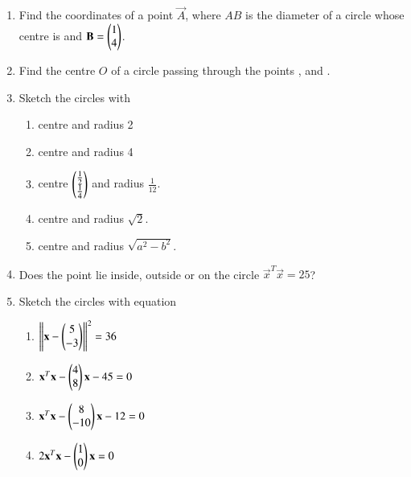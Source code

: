 \renewcommand{\theequation}{\theenumi}
\begin{enumerate}[label=\arabic*.,ref=\thesubsection.\theenumi]
\item Find the coordinates of a point $\vec{A}$, where $AB$ is the diameter of a circle whose centre is  and $\mathbf{B} = \begin{pmatrix}1\\4\end{pmatrix}$.
\\
\solution 

\item Find the centre $O$ of a circle passing through the points ,  and  .
\solution 

\item Sketch the circles with 
\begin{enumerate}
\item centre  and radius 2
\item centre  and radius 4
\item centre $\begin{pmatrix}\frac{1}{2}\\ \frac{1}{4}\end{pmatrix}$ and radius $\frac{1}{12}$.
\item centre  and radius $\sqrt{2}$.
\item centre  and radius $\sqrt{a^2-b^2}$.
\end{enumerate}
\solution 

\item  Does the point  lie inside, outside or on the circle $\vec{x}^T\vec{x} = 25$?
\\
\solution 

\item Sketch the circles with equation
\begin{enumerate}
\item $\left\lVert\mathbf{x}-\begin{pmatrix}5\\-3\end{pmatrix}\right\rVert^2 = 36$
\item $\mathbf{x}^T\mathbf{x}-\begin{pmatrix}4\\8\end{pmatrix}\mathbf{x} -45= 0$
\item $\mathbf{x}^T\mathbf{x}-\begin{pmatrix}8\\-10\end{pmatrix}\mathbf{x} -12= 0$
\item $2\mathbf{x}^T\mathbf{x}-\begin{pmatrix}1\\0\end{pmatrix}\mathbf{x} = 0$

\end{enumerate}
\end{enumerate}
